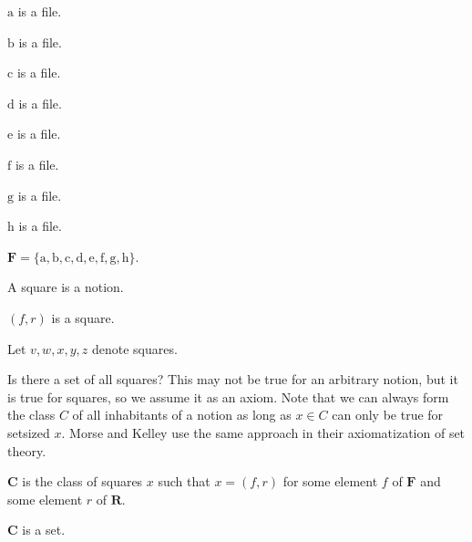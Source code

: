 \documentclass{article}
\newcommand{\Rank}{\mathbf{R}} %
\newcommand{\File}{\mathbf{F}} %
\newcommand{\fileA}{\mathrm{a}}
\newcommand{\fileB}{\mathrm{b}}
\newcommand{\fileC}{\mathrm{c}}
\newcommand{\fileD}{\mathrm{d}}
\newcommand{\fileE}{\mathrm{e}}
\newcommand{\fileF}{\mathrm{f}}
\newcommand{\fileG}{\mathrm{g}}
\newcommand{\fileH}{\mathrm{h}}
\newcommand{\Checkerboard}{\mathbf{C}}
\begin{document}
\begin{forthel}
    \begin{signature} $\fileA$ is a file. \end{signature}
    \begin{signature} $\fileB$ is a file. \end{signature}
    \begin{signature} $\fileC$ is a file. \end{signature}
    \begin{signature} $\fileD$ is a file. \end{signature}
    \begin{signature} $\fileE$ is a file. \end{signature}
    \begin{signature} $\fileF$ is a file. \end{signature}
    \begin{signature} $\fileG$ is a file. \end{signature}
    \begin{signature} $\fileH$ is a file. \end{signature}

    \begin{definition}
        $\File = \{\fileA,\fileB,\fileC,\fileD,\fileE,\fileF,\fileG,\fileH\}$.
    \end{definition}

    \begin{signature} A square is a notion. \end{signature}
    \begin{axiom} $(f, r)$ is a square. \end{axiom}
    Let $v, w, x, y, z$ denote squares.
\end{forthel}

Is there a set of all squares? This may not be true for an arbitrary notion,
but it is true for squares, so we assume it as an axiom. Note that we can always
form the class $C$ of all inhabitants of a notion as long as $x \in C$ can only be true
for setsized $x$.
Morse and Kelley \cite{Kelley1975,Morse1965} use the same approach in their axiomatization of set theory.

\begin{forthel}
    \begin{definition}
        $\Checkerboard$ is the class of squares $x$ such that $x = (f, r)$ for some
        element $f$ of $\File$ and some element $r$ of $\Rank$.
    \end{definition}

    \begin{axiom} $\Checkerboard$ is a set. \end{axiom}
\end{forthel}
\end{document}
